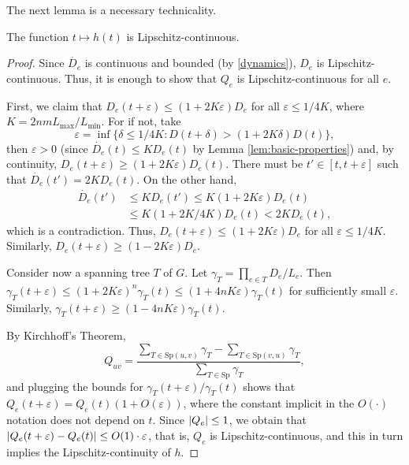\documentclass[11pt,a4paper]{article}
\newcommand{\Lmin}{\ensuremath{L_{\mathrm{min}}}}
\newcommand{\Lmax}{\ensuremath{L_{\mathrm{max}}}}
\newcommand{\sptree}{\mathrm{Sp}}
\begin{document}

The next lemma is a necessary technicality. 
\begin{lemma}
\label{lem:h-uc}
The function $t \mapsto h(t)$ is Lipschitz-continuous.
\end{lemma}
\begin{proof}
Since $\dot{D_e}$ is continuous and bounded (by \eqref{dynamics}), $D_e$ is
Lipschitz-continuous. Thus, it is enough to show that $Q_e$ is
Lipschitz-continuous for all $e$.  

First, we claim that $D_e(t+\varepsilon) \le (1+2K \varepsilon) D_e$ for all
$\varepsilon \le 1/4K$, where $K=2nm\Lmax/\Lmin$.  
For if not, take $$\varepsilon=\inf \{ \delta \le 1/4K : D(t+\delta) > (1+2K\delta) D(t) \},$$
then $\varepsilon > 0$ (since $\dot{D_e}(t) \le K D_e(t)$ by Lemma
\ref{lem:basic-properties}) and, by continuity, $D_e(t+\varepsilon) \ge
(1+2K\varepsilon) D_e(t)$.  
There must be $t' \in [t,t+\varepsilon]$ such that $\dot{D_e}(t') = 2K D_e(t)$. On the other hand,
\begin{align*}
 \dot{D_e}(t') &\le K D_e(t') \le K (1+2K \varepsilon) D_e(t)   \\
 & \le K (1+2K/4K) D_e(t) < 2 K D_e(t), 
\end{align*} 
which is a contradiction. Thus, $D_e(t+\varepsilon) \le (1+2K \varepsilon) D_e$ for all $\varepsilon \le 1/4K$. Similarly, $D_e(t+\varepsilon) \ge (1-2K \varepsilon) D_e$. 

Consider now a spanning tree $T$ of $G$. Let $\gamma_T = \prod_{e \in T}
D_e/L_e$. Then $\gamma_T(t+\varepsilon) \le (1+2K \varepsilon)^n \gamma_T(t)
\le (1+4nK \varepsilon) \gamma_T(t)$ for sufficiently small
$\varepsilon$. Similarly, $\gamma_T(t+\varepsilon) \ge (1-4nK \varepsilon)
\gamma_T(t)$.  

By Kirchhoff's Theorem, 
$$ Q_{uv} = \frac{\sum_{T \in \sptree(u,v)} \gamma_T - \sum_{T \in \sptree(v,u)} \gamma_T}{\sum_{T \in \sptree} \gamma_T}, $$
and plugging the bounds for $\gamma_T(t+\varepsilon) / \gamma_T(t)$ shows that $Q_e(t+\varepsilon) = Q_e(t) (1+O(\varepsilon))$, where the constant implicit in the $O(\cdot)$ notation does not depend on $t$. Since $| Q_e |\le 1$, we obtain that $| Q_e(t+\varepsilon)-Q_e(t) | \le O(1) \cdot \varepsilon$, that is, $Q_e$ is Lipschitz-continuous, and this in turn implies the Lipschitz-continuity of $h$.   
\end{proof}
\end{document}
